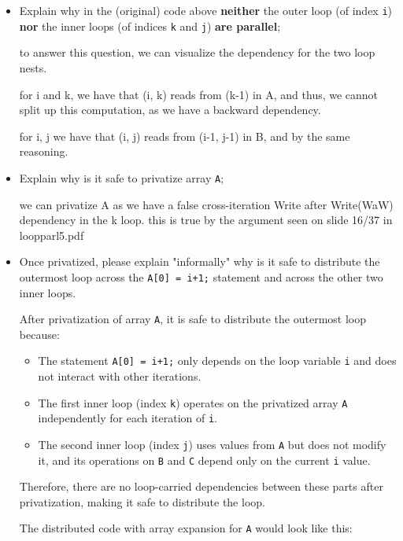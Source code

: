 \documentclass{article}
\begin{document}
\begin{itemize}
    \item Explain why in the (original) code above \textbf{neither} the outer loop (of index \texttt{i})
    \textbf{nor} the inner loops (of indices \texttt{k} and \texttt{j}) \textbf{are parallel};

    to answer this question, we can visualize the dependency for the two loop nests.

    for i and k, we have that (i, k) reads from (k-1) in A, and thus, we cannot split up this computation, as we have a backward dependency.

    for i, j we have that (i, j) reads from (i-1, j-1) in B, and by the same reasoning. 

    \item Explain why is it safe to privatize array \texttt{A};
    
    we can privatize A as we have a false cross-iteration Write after Write(WaW) dependency in the k loop.
    this is true by the argument seen on slide 16/37 in loopparl5.pdf
    
    \item Once privatized, please explain "informally" why is it safe to distribute 
    the outermost loop across the \texttt{A[0] = i+1;} statement and across the
    other two inner loops.  

    After privatization of array \texttt{A}, it is safe to distribute the outermost loop because:

    \begin{itemize}
        \item The statement \texttt{A[0] = i+1;} only depends on the loop variable \texttt{i} and does not interact with other iterations.
        \item The first inner loop (index \texttt{k}) operates on the privatized array \texttt{A} independently for each iteration of \texttt{i}.
        \item The second inner loop (index \texttt{j}) uses values from \texttt{A} but does not modify it, and its operations on \texttt{B} and \texttt{C} depend only on the current \texttt{i} value.
    \end{itemize}

    Therefore, there are no loop-carried dependencies between these parts after privatization, making it safe to distribute the loop.

    The distributed code with array expansion for \texttt{A} would look like this:


\end{itemize}
\end{document}
